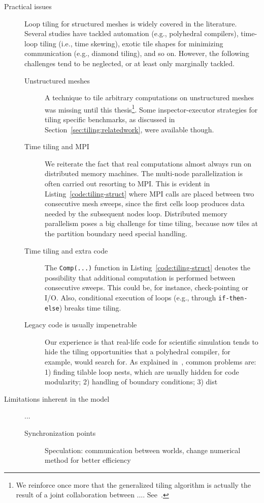 \begin{description}
\item[Practical issues] Loop tiling for structured meshes is widely covered in the literature. Several studies have tackled automation (e.g., polyhedral compilers), time-loop tiling (i.e., time skewing), exotic tile shapes for minimizing communication (e.g., diamond tiling), and so on. However, the following challenges tend to be neglected, or at least only marginally tackled.
\begin{description}
\item[Unstructured meshes] A technique to tile arbitrary computations on unstructured meshes was missing until this thesis\footnote{We reinforce once more that the generalized tiling algorithm is actually the result of a joint collaboration between .... See~\cite{st-paper}.}. Some inspector-executor strategies for tiling specific benchmarks, as discussed in Section~\ref{sec:tiling:relatedwork}, were available though. 
\item[Time tiling and MPI] We reiterate the fact that real computations almost always run on distributed memory machines. The multi-node parallelization is often carried out resorting to MPI. This is evident in Listing~\ref{code:tiling-struct} where MPI calls are placed between two consecutive mesh sweeps, since the first cells loop produces data needed by the subsequent nodes loop. Distributed memory parallelism poses a big challenge for time tiling, because now tiles at the partition boundary need special handling.
\item[Time tiling and extra code] The \texttt{Comp(...)} function in Listing~\ref{code:tiling-struct} denotes the possibility that additional computation is performed between consecutive sweeps. This could be, for instance, check-pointing or I/O. Also, conditional execution of loops (e.g., through \texttt{if-then-else}) breaks time tiling. 
\item[Legacy code is usually impenetrable] Our experience is that real-life code for scientific simulation tends to hide the tiling opportunities that a polyhedral compiler, for example, would search for. As explained in~\cite{strout-common-problems}, common problems are: 1) finding tilable loop nests, which are usually hidden for code modularity; 2) handling of boundary conditions; 3) dist
\end{description}

\item[Limitations inherent in the model] ...
\begin{description}
\item[Synchronization points] Speculation: communication between worlds, change numerical method for better efficiency

\end{description}

\end{description}


